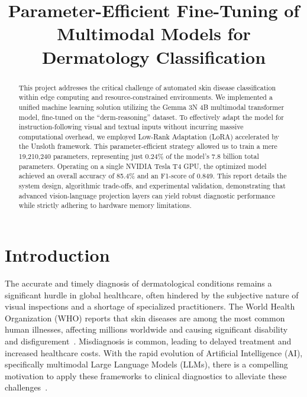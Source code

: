 \documentclass[11pt]{article}
\title{Parameter-Efficient Fine-Tuning of Multimodal Models for Dermatology Classification}
\author{}
\date{}
\begin{document}


\pagebreak

\tableofcontents

\pagebreak

\maketitle

\begin{abstract}
    This project addresses the critical challenge of automated skin disease classification within edge computing and resource-constrained environments. We implemented a unified machine learning solution utilizing the Gemma 3N 4B multimodal transformer model, fine-tuned on the ``derm-reasoning'' dataset. To effectively adapt the model for instruction-following visual and textual inputs without incurring massive computational overhead, we employed Low-Rank Adaptation (LoRA) accelerated by the Unsloth framework. This parameter-efficient strategy allowed us to train a mere 19,210,240 parameters, representing just 0.24\% of the model's 7.8 billion total parameters. Operating on a single NVIDIA Tesla T4 GPU, the optimized model achieved an overall accuracy of 85.4\% and an F1-score of 0.849. This report details the system design, algorithmic trade-offs, and experimental validation, demonstrating that advanced vision-language projection layers can yield robust diagnostic performance while strictly adhering to hardware memory limitations.
\end{abstract}



\section{Introduction}
The accurate and timely diagnosis of dermatological conditions remains a significant hurdle in global healthcare, often hindered by the subjective nature of visual inspections and a shortage of specialized practitioners. The World Health Organization (WHO) reports that skin diseases are among the most common human illnesses, affecting millions worldwide and causing significant disability and disfigurement~\cite{hay2014global}. Misdiagnosis is common, leading to delayed treatment and increased healthcare costs. With the rapid evolution of Artificial Intelligence (AI), specifically multimodal Large Language Models (LLMs), there is a compelling motivation to apply these frameworks to clinical diagnostics to alleviate these challenges~\cite{moor2023foundation}.
\end{document}

